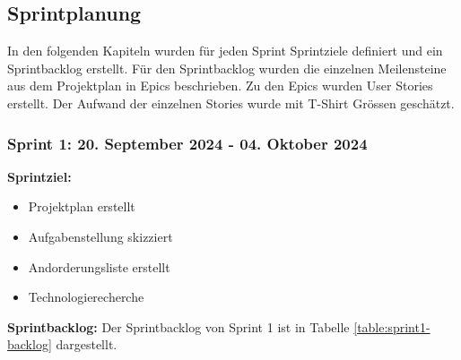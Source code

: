 \subsection{Sprintplanung}

In den folgenden Kapiteln wurden für jeden Sprint Sprintziele definiert und ein Sprintbacklog erstellt. Für den Sprintbacklog wurden die einzelnen Meilensteine aus dem Projektplan in Epics beschrieben. Zu den Epics wurden User Stories erstellt. Der Aufwand der einzelnen Stories wurde mit T-Shirt Grössen geschätzt.

\newpage
\subsubsection{Sprint 1: 20. September 2024 - 04. Oktober 2024}

\textbf{Sprintziel:}
\begin{itemize}
    \item Projektplan erstellt
    \item Aufgabenstellung skizziert
    \item Andorderungsliste erstellt
    \item Technologierecherche
\end{itemize}

\textbf{Sprintbacklog:} Der Sprintbacklog von Sprint 1 ist in Tabelle \ref{table:sprint1-backlog} dargestellt.

